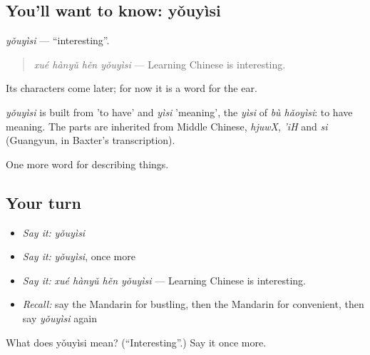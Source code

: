 \subsection*{You'll want to know: yǒuyìsi}
\emph{yǒuyìsi} — \textquotedblleft{}interesting\textquotedblright{}.

\begin{quote}
\emph{xué hànyǔ hěn yǒuyìsi} — Learning Chinese is interesting.
\end{quote}

Its characters come later; for now it is a word for the ear.

\begin{cousinweb}
\emph{yǒuyìsi} is built from  'to have' and \emph{yìsi} 'meaning', the \emph{yìsi} of \emph{bù hǎoyìsi}: to have meaning. The parts are inherited from Middle Chinese, \emph{hjuwX}, \emph{'iH} and \emph{si} (Guangyun, in Baxter's transcription).
\end{cousinweb}

\begin{grammarlens}[title={What you've built}]
One more word for describing things.
\end{grammarlens}

\subsection*{Your turn}
\begin{itemize}
\raggedright
  \item \emph{Say it:} \emph{yǒuyìsi}
  \item \emph{Say it:} \emph{yǒuyìsi}, once more
  \item \emph{Say it:} \emph{xué hànyǔ hěn yǒuyìsi} — Learning Chinese is interesting.
  \item \emph{Recall:} say the Mandarin for bustling, then the Mandarin for convenient, then say \emph{yǒuyìsi} again
\end{itemize}

\begin{tcolorbox}[breakable,colback=teal!4,colframe=teal!35!black,title={Before you move on}]
What does yǒuyìsi mean? (\textquotedblleft{}Interesting\textquotedblright{}.) Say it once more.
\end{tcolorbox}
